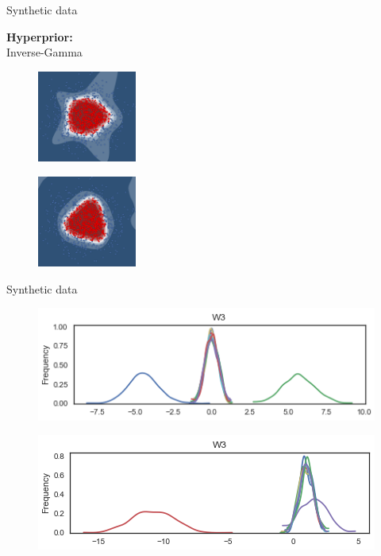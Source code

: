 \documentclass{beamer}
\begin{document}
\begin{frame}{Synthetic data}
	\begin{minipage}[t]{0.32\columnwidth}
		\vspace{0.2cm}
		\textbf{Hyperprior:} \\Inverse-Gamma
	\end{minipage}
	\begin{minipage}[t]{0.32\columnwidth}
		\begin{figure}
			\includegraphics[height=3cm]{pres_pics/h_gauss.png}
		\end{figure}
	\end{minipage}
	\begin{minipage}[t]{0.32\columnwidth}
		\begin{figure}
			\includegraphics[height=3cm]{pres_pics/h_laplace.png}
		\end{figure}
	\end{minipage}
\end{frame} 
\begin{frame}{Synthetic data}
	\begin{figure}
		\includegraphics[width=1\columnwidth]{pres_pics/trace_laplace_w3.png}
	\end{figure}
	\begin{figure}
		\includegraphics[width=1\columnwidth]{pres_pics/trace_cauchy_w3.png}
	\end{figure}
\end{frame}
\end{document}
